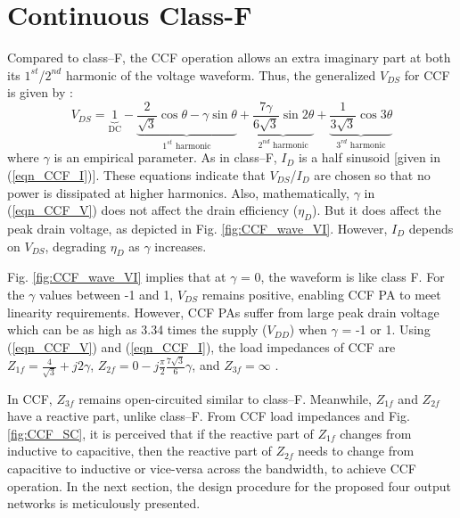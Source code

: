 \documentclass[conference]{IEEEtran}
\begin{document}

\section{Continuous Class-F}
\label{section:CCF}
\vspace{-0.05in}
Compared to class--F, the CCF operation allows an extra imaginary part at both its $1^{st}$/$2^{nd}$ harmonic of the voltage waveform. Thus, the generalized $V_{DS}$ for CCF is given by \cite{ECCF_Carrubba}:
\begin{equation}
V_{DS}=\underbrace{1}_{\text{DC}}-\underbrace{\frac{2}{\sqrt{3}} \cos \theta-\gamma \sin \theta}_{\text{$1^{st}$ harmonic}}+\underbrace{\frac{7 \gamma}{6 \sqrt{3}} \sin 2 \theta}_{\text{$2^{nd}$ harmonic}}+\underbrace{\frac{1}{3 \sqrt{3}} \cos 3 \theta}_{\text{$3^{rd}$ harmonic}}
\label{eqn_CCF_V}
\end{equation}
where $\gamma$ is an empirical parameter. As in class--F, $I_{D}$ is a half sinusoid [given in (\ref{eqn_CCF_I})]. These equations indicate that $V_{DS}$/$I_{D}$ are chosen so that no power is dissipated at higher harmonics. Also, mathematically, $\gamma$ in (\ref{eqn_CCF_V}) does not affect the drain efficiency ($\eta_D$). But it does affect the peak drain voltage, as depicted in Fig. \ref{fig:CCF_wave_VI}. However, $I_{D}$ depends on $V_{DS}$, degrading $\eta_D$ as $\gamma$ increases.


Fig. \ref{fig:CCF_wave_VI} implies that at $\gamma$ = 0, the waveform is like class F. For the $\gamma$ values between -1 and 1, $V_{DS}$ remains positive, enabling CCF PA to meet linearity requirements. However, CCF PAs suffer from large peak drain voltage which can be as high as 3.34 times the supply ($V_{DD}$) when $\gamma$ = -1 or 1. Using (\ref{eqn_CCF_V}) and (\ref{eqn_CCF_I}), the load impedances of CCF  are $Z_{1f}=\frac{4}{\sqrt{3}}+j 2 \gamma$, $Z_{2f}=0-j \frac{\pi}{2} \frac{7 \sqrt{3}}{6} \gamma$, and $Z_{3f}=\infty$ \cite{CCFDesign_ali}.


In CCF, $Z_{3f}$ remains open-circuited similar to class--F. Meanwhile, $Z_{1f}$ and $Z_{2f}$ have a reactive part, unlike class--F. From CCF load impedances and Fig. \ref{fig:CCF_SC}, it is perceived that if the reactive part of $Z_{1f}$ changes from inductive to capacitive, then the reactive part of $Z_{2f}$  needs to change from capacitive to inductive or vice-versa across the bandwidth, to achieve CCF operation. In the next section, the design procedure for the proposed four output networks is meticulously presented. 
\end{document}
